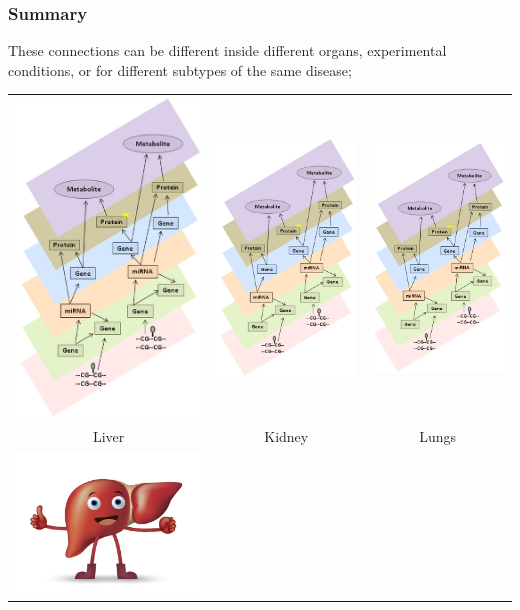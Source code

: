 \documentclass[10pt]{beamer}
\theoremstyle{definition}
\begin{document}
\begin{frame}
\frametitle{Summary}

These connections can be different inside different organs, experimental conditions, or for different subtypes of the same disease;

\begin{center}
\begin{scriptsize}
\begin{tabular}{ccc}
\includegraphics[width=.2\textwidth]{multi-omics1}
\vspace{.5em}
& \includegraphics[width=.2\textwidth]{multi-omics1}
\vspace{.5em}
& \includegraphics[width=.2\textwidth]{multi-omics1}
\vspace{.5em}\\
Liver & Kidney & Lungs\\
\includegraphics[width=.2\textwidth]{liver}

\end{tabular}
\end{scriptsize}
\end{center}
\end{frame}
\end{document}
